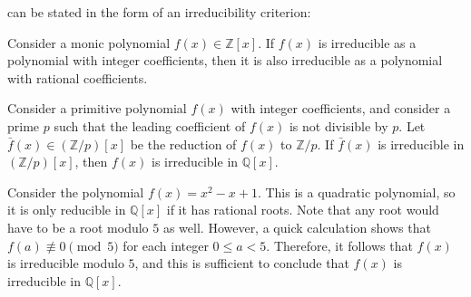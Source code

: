  can be stated in the form of an irreducibility criterion:

\begin{corollary}\label{corollary:gausss-lemma-polynomials}
  Consider a monic polynomial $f(x)\in\mathbb{Z}[x]$. If $f(x)$ is irreducible as a polynomial with integer coefficients, then it is also irreducible as a polynomial with rational coefficients.
\end{corollary}

\begin{corollary}
  Consider a primitive polynomial $f(x)$ with integer coefficients, and consider a prime $p$ such that the leading coefficient of $f(x)$ is not divisible by $p$. Let $\bar{f}(x)\in (\mathbb{Z}/p)[x]$ be the reduction of $f(x)$ to $\mathbb{Z}/p$. If $\bar{f}(x)$ is irreducible in $(\mathbb{Z}/p)[x]$, then $f(x)$ is irreducible in $\mathbb{Q}[x]$.
\end{corollary}

\begin{example}
  Consider the polynomial $f(x)=x^2-x+1$. This is a quadratic polynomial, so it is only reducible in $\mathbb{Q}[x]$ if it has rational roots. Note that any root would have to be a root modulo $5$ as well. However, a quick calculation shows that $f(a)\nequiv 0 \pmod{5}$ for each integer $0\leq a<5$. Therefore, it follows that $f(x)$ is irreducible modulo $5$, and this is sufficient to conclude that $f(x)$ is irreducible in $\mathbb{Q}[x]$.
\end{example}

